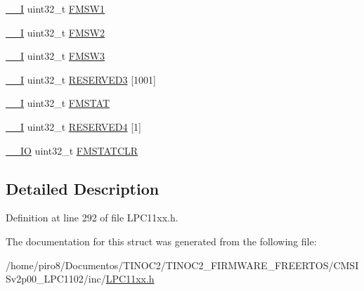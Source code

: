 \begin{DoxyCompactItemize}
\item 
\hyperlink{group___c_m_s_i_s__core__definitions_gaf63697ed9952cc71e1225efe205f6cd3}{\+\_\+\+\_\+I} uint32\+\_\+t \hyperlink{group___l_p_c11xx___definitions_gabc341282b3494e79a8ca5ba5eb563559}{F\+M\+S\+W1}
\item 
\hyperlink{group___c_m_s_i_s__core__definitions_gaf63697ed9952cc71e1225efe205f6cd3}{\+\_\+\+\_\+I} uint32\+\_\+t \hyperlink{group___l_p_c11xx___definitions_ga409818874ee3d884138c96416fafe2ca}{F\+M\+S\+W2}
\item 
\hyperlink{group___c_m_s_i_s__core__definitions_gaf63697ed9952cc71e1225efe205f6cd3}{\+\_\+\+\_\+I} uint32\+\_\+t \hyperlink{group___l_p_c11xx___definitions_gae2b52687fb425ae91ed7937501dfc036}{F\+M\+S\+W3}
\item 
\hyperlink{group___c_m_s_i_s__core__definitions_gaf63697ed9952cc71e1225efe205f6cd3}{\+\_\+\+\_\+I} uint32\+\_\+t \hyperlink{group___l_p_c11xx___definitions_ga5c05e98fac013cde1a119a3e91dde5d4}{R\+E\+S\+E\+R\+V\+E\+D3} \mbox{[}1001\mbox{]}
\item 
\hyperlink{group___c_m_s_i_s__core__definitions_gaf63697ed9952cc71e1225efe205f6cd3}{\+\_\+\+\_\+I} uint32\+\_\+t \hyperlink{group___l_p_c11xx___definitions_gac196f302787ff85c055a02a32fae86d6}{F\+M\+S\+T\+AT}
\item 
\hyperlink{group___c_m_s_i_s__core__definitions_gaf63697ed9952cc71e1225efe205f6cd3}{\+\_\+\+\_\+I} uint32\+\_\+t \hyperlink{group___l_p_c11xx___definitions_ga01c56664dd38ea6e92198855afc93af3}{R\+E\+S\+E\+R\+V\+E\+D4} \mbox{[}1\mbox{]}
\item 
\hyperlink{group___c_m_s_i_s__core__definitions_gaec43007d9998a0a0e01faede4133d6be}{\+\_\+\+\_\+\+IO} uint32\+\_\+t \hyperlink{group___l_p_c11xx___definitions_gaf55332ea67635bc3c2cad7d51a9478f6}{F\+M\+S\+T\+A\+T\+C\+LR}
\end{DoxyCompactItemize}


\subsection{Detailed Description}


Definition at line 292 of file L\+P\+C11xx.\+h.



The documentation for this struct was generated from the following file\+:\begin{DoxyCompactItemize}
\item 
/home/piro8/\+Documentos/\+T\+I\+N\+O\+C2/\+T\+I\+N\+O\+C2\+\_\+\+F\+I\+R\+M\+W\+A\+R\+E\+\_\+\+F\+R\+E\+E\+R\+T\+O\+S/\+C\+M\+S\+I\+Sv2p00\+\_\+\+L\+P\+C1102/inc/\hyperlink{_l_p_c11xx_8h}{L\+P\+C11xx.\+h}\end{DoxyCompactItemize}
